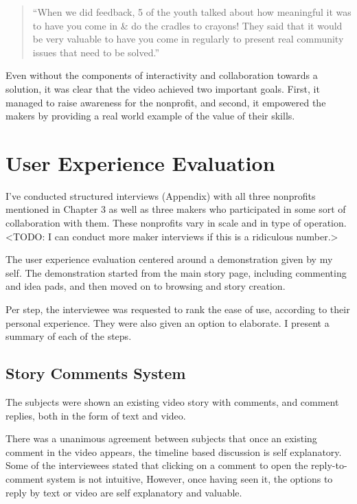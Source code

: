 \begin{quotation}

``When we did feedback, 5 of the youth talked about how meaningful it was to have you come in \& do the cradles to crayons! They said that it would be very valuable to have you come in regularly to present real community issues that need to be solved.''

\end{quotation}

Even without the components of interactivity and collaboration towards a solution, it was clear that the video achieved two important goals. First, it managed to raise awareness for the nonprofit, and second, it empowered the makers by providing a real world example of the value of their skills.


\section{User Experience Evaluation}

I've conducted structured interviews (Appendix) with all three nonprofits mentioned in Chapter 3 as well as three makers who participated in some sort of collaboration with them. These nonprofits vary in scale and in type of operation. <TODO: I can conduct more maker interviews if this is a ridiculous number.>

The user experience evaluation centered around a demonstration given by my self. The demonstration started from the main story page, including commenting and idea pads, and then moved on to browsing and story creation. 

Per step, the interviewee was requested to rank the ease of use, according to their personal experience. They were also given an option to elaborate. I present a summary of each of the steps.

\subsection{Story Comments System}

The subjects were shown an existing video story with comments, and comment replies, both in the form of text and video.

There was a unanimous agreement between subjects that once an existing comment in the video appears, the timeline based discussion is self explanatory. Some of the interviewees stated that clicking on a comment to open the reply-to-comment system is not intuitive, However, once having seen it, the options to reply by text or video are self explanatory and valuable.

